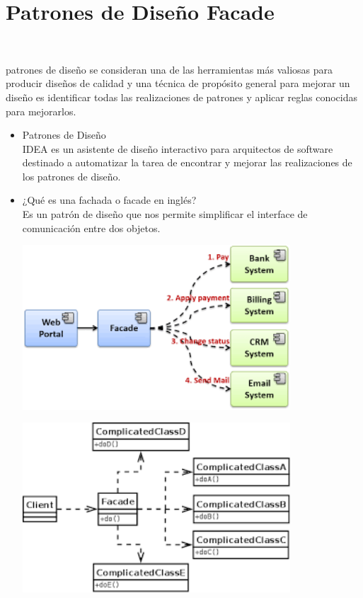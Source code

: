 \section{Patrones de Diseño Facade} 
\textbf{}\\
\begin{flushleft}
patrones de diseño se consideran una de las herramientas más valiosas para producir diseños de calidad y una técnica de propósito general para mejorar un diseño es identificar todas las realizaciones de patrones y aplicar reglas conocidas para mejorarlos.

\begin{itemize}
	\item Patrones de Diseño
	\\IDEA es un asistente de diseño interactivo para arquitectos de software destinado a automatizar la tarea de encontrar y mejorar las realizaciones de los patrones de diseño.


	


	\item ¿Qué es una fachada o facade en inglés?
	\\ Es un patrón de diseño que nos permite simplificar el interface de comunicación entre dos objetos.
	\begin{center}
	\includegraphics[width=10cm]{./Imagenes/1} 
	\end{center}

	
	\begin{center}
	\includegraphics[width=10cm]{./Imagenes/2} 
	\end{center}



\end{itemize}
\end{flushleft}
